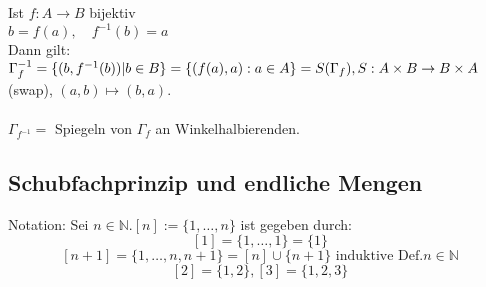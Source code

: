 \documentclass[../ana1.tex]{subfiles}
\begin{document}
\begin{bsp}
	Ist \(f: A\rightarrow B\) bijektiv\\
	\(b=f(a),\quad f^{-1}(b)=a\) \\
	Dann gilt: \(\Gamma_f^{-1} = \{(b, f^{-1}(b)) | b\in B\} \\
	= \{(f(a),a):a\in A\} = S(\Gamma_f), S: A\times B \rightarrow B\times A\) (swap), \( (a,b)\mapsto(b,a) \).\\
	 \quad
	\\
	\(\Gamma_{f^{-1}} = \) Spiegeln von \( \Gamma_f \) an Winkelhalbierenden.
\end{bsp}


\subsection{Schubfachprinzip und endliche Mengen}

Notation: Sei $n\in\mathbb{N}. [n] := \{1,\ldots,n\}$ ist gegeben durch:
$$[1] = \{1,\ldots,1\} = \{1\}$$
$$[n+1] = \{1,\ldots,n,n+1\} = [n] \cup \{n+1\}\text{ induktive Def.} n\in\mathbb{N}$$
$$[2]=\{1,2\}, [3]=\{1,2,3\}$$
\end{document}
